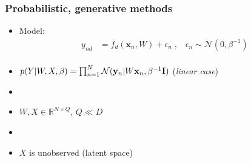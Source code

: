 \documentclass{beamer}
\begin{document}
\begin{frame}
\frametitle{Probabilistic, generative methods}
\begin{itemize}
\item \alert{Model}:
	\begin{align*}
	y_{nd} &= f_d(\mathbf{x}_n, W)
					 + \epsilon_n \;, \;\;\; \epsilon_n \sim \mathcal{N}(0, \beta^{-1})\\
	\end{align*}
\item $p(Y|W,X,\beta)=\prod_{n=1}^N \mathcal{N}({\bf y}_n|W{\bf x}_n, \beta^{-1}\mathbf{I})$ (\textit{linear case})
\item[]
\item $W,X \in \mathbb{R}^{N \times Q}$, $Q \ll D$
\item[]
\item $X$ is unobserved (\alert{latent space})

\end{itemize}
\end{frame}
\end{document}
